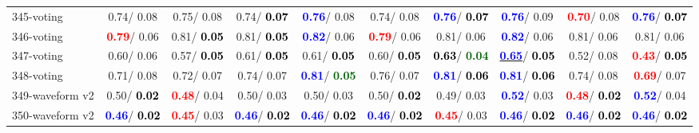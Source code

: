 \begin{table}[h]
\begin{center}
{\begin{tabular}{lc|c|c|c|c|c|c|c|c}
345-voting &   0.74/  0.08 &   0.75/  0.08 &   0.74/\textcolor{black}{\textbf{  0.07}} & \textcolor{blue}{\textbf{  0.76}}/  0.08 &   0.74/  0.08 & \textcolor{blue}{\textbf{  0.76}}/\textcolor{black}{\textbf{  0.07}} & \textcolor{blue}{\textbf{  0.76}}/  0.09 & \textcolor{red}{\textbf{  0.70}}/  0.08 & \textcolor{blue}{\textbf{  0.76}}/\textcolor{black}{\textbf{  0.07}} \\
346-voting & \textcolor{red}{\textbf{  0.79}}/  0.06 &   0.81/\textcolor{black}{\textbf{  0.05}} &   0.81/\textcolor{black}{\textbf{  0.05}} & \textcolor{blue}{\textbf{  0.82}}/  0.06 & \textcolor{red}{\textbf{  0.79}}/  0.06 &   0.81/  0.06 & \textcolor{blue}{\textbf{  0.82}}/  0.06 &   0.81/  0.06 &   0.81/  0.06 \\
347-voting &   0.60/  0.06 &   0.57/\textcolor{black}{\textbf{  0.05}} &   0.61/\textcolor{black}{\textbf{  0.05}} &   0.61/\textcolor{black}{\textbf{  0.05}} &   0.60/\textcolor{black}{\textbf{  0.05}} & \textcolor{black}{\textbf{  0.63}}/\textcolor{darkgreen}{\textbf{  0.04}} & \underline{\textcolor{blue}{\textbf{  0.65}}}/\textcolor{black}{\textbf{  0.05}} &   0.52/  0.08 & \textcolor{red}{\textbf{  0.43}}/\textcolor{black}{\textbf{  0.05}} \\
348-voting &   0.71/  0.08 &   0.72/  0.07 &   0.74/  0.07 & \textcolor{blue}{\textbf{  0.81}}/\textcolor{darkgreen}{\textbf{  0.05}} &   0.76/  0.07 & \textcolor{blue}{\textbf{  0.81}}/\textcolor{black}{\textbf{  0.06}} & \textcolor{blue}{\textbf{  0.81}}/\textcolor{black}{\textbf{  0.06}} &   0.74/  0.08 & \textcolor{red}{\textbf{  0.69}}/  0.07 \\ \hline
349-waveform v2 &   0.50/\textcolor{black}{\textbf{  0.02}} & \textcolor{red}{\textbf{  0.48}}/  0.04 &   0.50/  0.03 &   0.50/  0.03 &   0.50/\textcolor{black}{\textbf{  0.02}} &   0.49/  0.03 & \textcolor{blue}{\textbf{  0.52}}/  0.03 & \textcolor{red}{\textbf{  0.48}}/\textcolor{black}{\textbf{  0.02}} & \textcolor{blue}{\textbf{  0.52}}/  0.04 \\
350-waveform v2 & \textcolor{blue}{\textbf{  0.46}}/\textcolor{black}{\textbf{  0.02}} & \textcolor{red}{\textbf{  0.45}}/  0.03 & \textcolor{blue}{\textbf{  0.46}}/\textcolor{black}{\textbf{  0.02}} & \textcolor{blue}{\textbf{  0.46}}/\textcolor{black}{\textbf{  0.02}} & \textcolor{blue}{\textbf{  0.46}}/\textcolor{black}{\textbf{  0.02}} & \textcolor{red}{\textbf{  0.45}}/  0.03 & \textcolor{blue}{\textbf{  0.46}}/\textcolor{black}{\textbf{  0.02}} & \textcolor{blue}{\textbf{  0.46}}/\textcolor{black}{\textbf{  0.02}} & \textcolor{blue}{\textbf{  0.46}}/\textcolor{black}{\textbf{  0.02}} \\

\end{tabular}}
\end{center}
\end{table}

